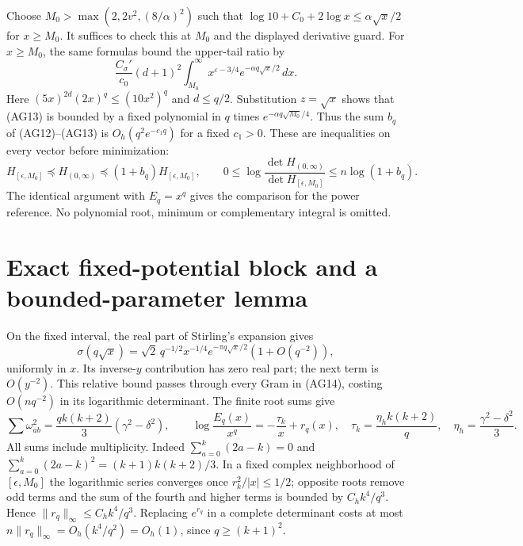 \documentclass[11pt]{article}
\newcommand{\dd}{\,d}\newcommand{\Gram}{\operatorname{Gram}}
\begin{document}
Choose $M_0>\max(2,2v^2,(8/\alpha)^2)$ such that
$\log10+C_0+2\log x\le\alpha\sqrt x/2$ for $x\ge M_0$.
It suffices to check this at $M_0$ and the displayed derivative guard.
For $x\ge M_0$, the same formulas bound the upper-tail ratio by
\begin{equation}\tag{AG13}
 \frac{C_\sigma'}{c_0}(d+1)^2
 \int_{M_0}^\infty x^{\varepsilon-3/4}
                  e^{-\alpha q\sqrt x/2}\dd x.
\end{equation}
Here $(5x)^{2d}(2x)^q\le(10x^2)^q$ and $d\le q/2$.
Substitution $z=\sqrt x$ shows that (AG13) is bounded by a fixed
polynomial in $q$ times $e^{-\alpha q\sqrt{M_0}/4}$.
Thus the sum $b_q$ of (AG12)--(AG13) is $O_h(q^2e^{-c_1q})$ for a
fixed $c_1>0$. These are inequalities on every vector before minimization:
\begin{equation}\tag{AG14}
 H_{[\epsilon,M_0]}\preceq H_{(0,\infty)}
 \preceq(1+b_q)H_{[\epsilon,M_0]},\qquad
 0\le\log\frac{\det H_{(0,\infty)}}{\det H_{[\epsilon,M_0]}}
 \le n\log(1+b_q).
\end{equation}
The identical argument with $E_q=x^q$ gives the comparison for the power
reference. No polynomial root, minimum or complementary integral is omitted.

\section{Exact fixed-potential block and a bounded-parameter lemma}
On the fixed interval, the real part of Stirling's expansion gives
\begin{equation}\tag{AG15}
 \sigma(q\sqrt x)=\sqrt2\,q^{-1/2}x^{-1/4}
 e^{-\pi q\sqrt x/2}(1+O(q^{-2})),
\end{equation}
uniformly in $x$. Its inverse-$y$ contribution has zero real part;
the next term is $O(y^{-2})$. This relative bound passes through every
Gram in (AG14), costing $O(nq^{-2})$ in its logarithmic determinant.
The finite root sums give
\begin{equation}\tag{AG16}
 \sum\omega_{ab}^2=\frac{qk(k+2)}3(\gamma^2-\delta^2),\qquad
 \log\frac{E_q(x)}{x^q}=-\frac{\tau_k}{x}+r_q(x),
 \quad \tau_k=\frac{\eta_hk(k+2)}q,\quad
 \eta_h=\frac{\gamma^2-\delta^2}3.
\end{equation}
All sums include multiplicity. Indeed
$\sum_{a=0}^k(2a-k)=0$ and
$\sum_{a=0}^k(2a-k)^2=(k+1)k(k+2)/3$.
In a fixed complex neighborhood of $[\epsilon,M_0]$ the logarithmic series
converges once $r_k^2/|x|\le1/2$; opposite roots remove odd terms and the
sum of the fourth and higher terms is bounded by
$C_h k^4/q^3$. Hence $\|r_q\|_\infty\le C_hk^4/q^3$.
Replacing $e^{r_q}$ in a complete determinant costs at most
$n\|r_q\|_\infty=O_h(k^4/q^2)=O_h(1)$, since $q\ge(k+1)^2$.
\end{document}
